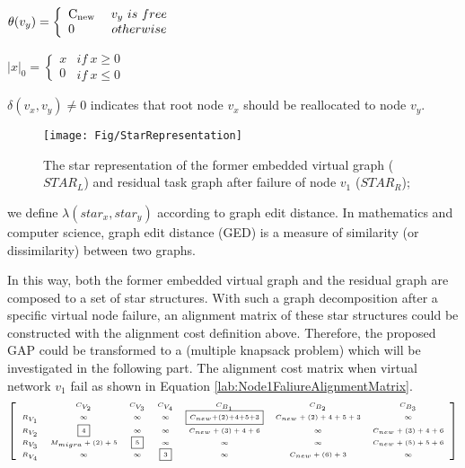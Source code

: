 $\theta ({v_y}) = \left\{ \begin{array}{l}
{\rm{C_{new}}}\\
0
\end{array} \right.\begin{array}{*{20}{c}}
v_y\ is\ free\\
{otherwise}
\end{array}$

$|x|_0 = \left\{ \begin{array}{l}
{x}\\
0
\end{array} \right.\begin{array}{*{20}{c}}
if\ x\geq 0\\
{if\ x\leq 0}
\end{array}$

$\delta(v_x,v_y)\neq 0$ indicates that  root node $v_x$ should be reallocated to node $v_y$.
\begin{figure}
\centering
\texttt{[image: Fig/StarRepresentation]}\\
  \caption{The star representation of the former embedded virtual graph ($STAR_L$) and residual task graph after failure of node $v_1$ ($STAR_R$);}\label{fig:StarRepresentation}
\end{figure}

we define $\lambda(star_x,star_y)$ according to graph edit distance\cite{sanfeliu1983distance}. In mathematics and computer science, graph edit distance (GED) is a measure of similarity (or dissimilarity) between two graphs.

In this way, both the former embedded virtual graph and the residual graph are composed to  a set of star structures. With such a graph decomposition after a specific virtual node failure, an alignment matrix of these star structures could be constructed with the alignment cost definition above. Therefore, the proposed GAP could be transformed to a (multiple knapsack problem) which will be investigated in the following part. The alignment cost matrix when virtual network $v_1$ fail as shown in Equation \ref{lab:Node1FaliureAlignmentMatrix}.
\begin{equation}
\tiny{
\left[ {\begin{array}{*{20}{c}}
&C_{V_{2}}&C_{V_3}&C_{V_4}&C_{B_{1}}&C_{B_{2}}&C_{B_{3}}\\
{R_{V_1}}&\infty&\infty&\infty&\fbox{$C_{new}$+(2)+4+5+3}&C_{new}+(2)+4+5+3&\infty\\
R_{V_2}&\fbox{4}&\infty&\infty&C_{new}+(3)+4+6&\infty&C_{new}+(3)+4+6\\
R_{V_3}&M_{migra}+(2)+5&\fbox{5}&\infty&\infty&\infty&C_{new}+(5)+5+6\\
R_{V_4}&\infty&\infty&\fbox{3}&\infty&C_{new}+(6)+3&\infty\\
\end{array}} \right]
}
\label{lab:Node1FaliureAlignmentMatrix}
\end{equation}

